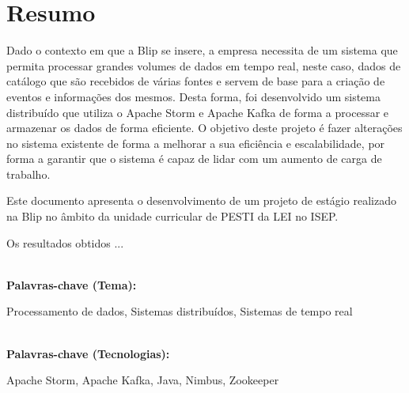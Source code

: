 \titleformat{\chapter}[display]
{\normalfont\bfseries}{}{0pt}{\Huge}

\chapter*{Resumo}

Dado o contexto em que a Blip se insere, a empresa necessita de um sistema que permita processar
grandes volumes de dados em tempo real, neste caso, dados de catálogo que são recebidos de várias fontes
e servem de base para a criação de eventos e informações dos mesmos. Desta forma, foi desenvolvido 
um sistema distribuído que utiliza o Apache Storm e Apache Kafka de forma a processar e armazenar 
os dados de forma eficiente. O objetivo deste projeto é fazer alterações no sistema existente de forma
a melhorar a sua eficiência e escalabilidade, por forma a garantir que o sistema é capaz de lidar com
um aumento de carga de trabalho.

Este documento apresenta o desenvolvimento de um projeto de estágio realizado na Blip no 
âmbito da unidade curricular de \ac{PESTI} da \ac{LEI} no \ac{ISEP}. 

Os resultados obtidos ...


\textbf{\\Palavras-chave (Tema): } 

Processamento de dados, Sistemas distribuídos, Sistemas de tempo real

\textbf{\\Palavras-chave (Tecnologias):}

Apache Storm, Apache Kafka, Java, Nimbus, Zookeeper


